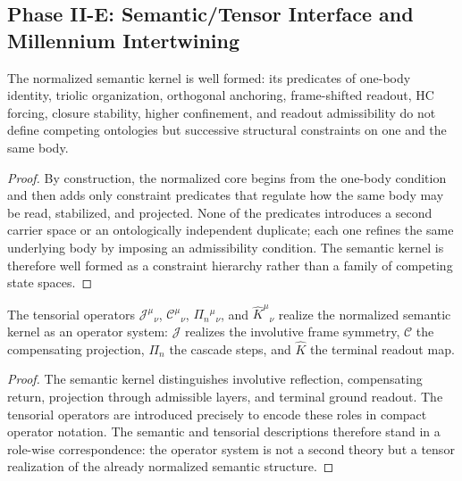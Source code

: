 \subsection*{Phase II-E: Semantic/Tensor Interface and Millennium Intertwining}

\begin{lemma}
\label{lem:semantic-kernel-well-formedness-lemma}
The normalized semantic kernel is well formed: its predicates of one-body
identity, triolic organization, orthogonal anchoring, frame-shifted readout,
HC forcing, closure stability, higher confinement, and readout admissibility do
not define competing ontologies but successive structural constraints on one and
the same body.
\end{lemma}

\begin{proof}
By construction, the normalized core begins from the one-body condition and then
adds only constraint predicates that regulate how the same body may be read,
stabilized, and projected. None of the predicates introduces a second carrier
space or an ontologically independent duplicate; each one refines the same
underlying body by imposing an admissibility condition. The semantic kernel is
therefore well formed as a constraint hierarchy rather than a family of
competing state spaces.
\end{proof}

\begin{lemma}
\label{lem:tensor-realization-lemma}
The tensorial operators $\mathcal J^\mu{}_{\nu}$, $\mathcal C^\mu{}_{\nu}$,
$\Pi_n{}^\mu{}_{\nu}$, and $\hat K^\mu{}_{\nu}$ realize the normalized semantic
kernel as an operator system: $\mathcal J$ realizes the involutive frame
symmetry, $\mathcal C$ the compensating projection, $\Pi_n$ the cascade steps,
and $\hat K$ the terminal readout map.
\end{lemma}

\begin{proof}
The semantic kernel distinguishes involutive reflection, compensating return,
projection through admissible layers, and terminal ground readout. The tensorial
operators are introduced precisely to encode these roles in compact operator
notation. The semantic and tensorial descriptions therefore stand in a role-wise
correspondence: the operator system is not a second theory but a tensor
realization of the already normalized semantic structure.
\end{proof}

